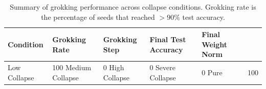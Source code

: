 \begin{table}[h]
\centering
\begin{tabular}{lllll}
\toprule
Condition & Grokking Rate & Grokking Step & Final Test Accuracy & Final Weight Norm \\
\midrule
Low Collapse & 100%
Medium Collapse & 0%
High Collapse & 0%
Severe Collapse & 0%
Pure & 100%
\bottomrule
\end{tabular}
\caption{Summary of grokking performance across collapse conditions. Grokking rate is the percentage of seeds that reached $>90\%$ test accuracy.}
\label{tab:main_results}
\end{table}

